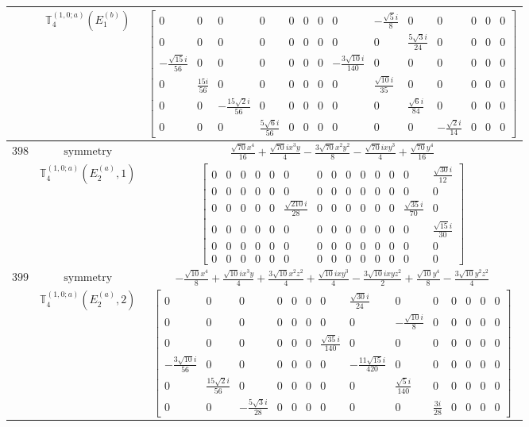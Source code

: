 \documentclass[fleqn,8pt,landscape]{jsarticle}
\begin{document}
\begin{longtable}{ccc}
$  $ & $ \mathbb{T}_{4}^{(1,0;a)}(E_{1}^{(b)}) $ & $ \begin{bmatrix} 0 & 0 & 0 & 0 & 0 & 0 & 0 & 0 & - \frac{\sqrt{5} i}{8} & 0 & 0 & 0 & 0 & 0 \\ 0 & 0 & 0 & 0 & 0 & 0 & 0 & 0 & 0 & \frac{5 \sqrt{3} i}{24} & 0 & 0 & 0 & 0 \\ - \frac{\sqrt{15} i}{56} & 0 & 0 & 0 & 0 & 0 & 0 & - \frac{3 \sqrt{10} i}{140} & 0 & 0 & 0 & 0 & 0 & 0 \\ 0 & \frac{15 i}{56} & 0 & 0 & 0 & 0 & 0 & 0 & \frac{\sqrt{10} i}{35} & 0 & 0 & 0 & 0 & 0 \\ 0 & 0 & - \frac{15 \sqrt{2} i}{56} & 0 & 0 & 0 & 0 & 0 & 0 & \frac{\sqrt{6} i}{84} & 0 & 0 & 0 & 0 \\ 0 & 0 & 0 & \frac{5 \sqrt{6} i}{56} & 0 & 0 & 0 & 0 & 0 & 0 & - \frac{\sqrt{2} i}{14} & 0 & 0 & 0 \end{bmatrix} $ \\ \hline
$ 398 $ & $ \text{symmetry} $ & $ \frac{\sqrt{70} x^{4}}{16} + \frac{\sqrt{70} i x^{3} y}{4} - \frac{3 \sqrt{70} x^{2} y^{2}}{8} - \frac{\sqrt{70} i x y^{3}}{4} + \frac{\sqrt{70} y^{4}}{16} $ \\
$  $ & $ \mathbb{T}_{4}^{(1,0;a)}(E_{2}^{(a)},1) $ & $ \begin{bmatrix} 0 & 0 & 0 & 0 & 0 & 0 & 0 & 0 & 0 & 0 & 0 & 0 & 0 & \frac{\sqrt{30} i}{12} \\ 0 & 0 & 0 & 0 & 0 & 0 & 0 & 0 & 0 & 0 & 0 & 0 & 0 & 0 \\ 0 & 0 & 0 & 0 & 0 & \frac{\sqrt{210} i}{28} & 0 & 0 & 0 & 0 & 0 & 0 & \frac{\sqrt{35} i}{70} & 0 \\ 0 & 0 & 0 & 0 & 0 & 0 & 0 & 0 & 0 & 0 & 0 & 0 & 0 & \frac{\sqrt{15} i}{30} \\ 0 & 0 & 0 & 0 & 0 & 0 & 0 & 0 & 0 & 0 & 0 & 0 & 0 & 0 \\ 0 & 0 & 0 & 0 & 0 & 0 & 0 & 0 & 0 & 0 & 0 & 0 & 0 & 0 \end{bmatrix} $ \\ \hline
$ 399 $ & $ \text{symmetry} $ & $ - \frac{\sqrt{10} x^{4}}{8} + \frac{\sqrt{10} i x^{3} y}{4} + \frac{3 \sqrt{10} x^{2} z^{2}}{4} + \frac{\sqrt{10} i x y^{3}}{4} - \frac{3 \sqrt{10} i x y z^{2}}{2} + \frac{\sqrt{10} y^{4}}{8} - \frac{3 \sqrt{10} y^{2} z^{2}}{4} $ \\
$  $ & $ \mathbb{T}_{4}^{(1,0;a)}(E_{2}^{(a)},2) $ & $ \begin{bmatrix} 0 & 0 & 0 & 0 & 0 & 0 & 0 & \frac{\sqrt{30} i}{24} & 0 & 0 & 0 & 0 & 0 & 0 \\ 0 & 0 & 0 & 0 & 0 & 0 & 0 & 0 & - \frac{\sqrt{10} i}{8} & 0 & 0 & 0 & 0 & 0 \\ 0 & 0 & 0 & 0 & 0 & 0 & \frac{\sqrt{35} i}{140} & 0 & 0 & 0 & 0 & 0 & 0 & 0 \\ - \frac{3 \sqrt{10} i}{56} & 0 & 0 & 0 & 0 & 0 & 0 & - \frac{11 \sqrt{15} i}{420} & 0 & 0 & 0 & 0 & 0 & 0 \\ 0 & \frac{15 \sqrt{2} i}{56} & 0 & 0 & 0 & 0 & 0 & 0 & \frac{\sqrt{5} i}{140} & 0 & 0 & 0 & 0 & 0 \\ 0 & 0 & - \frac{5 \sqrt{3} i}{28} & 0 & 0 & 0 & 0 & 0 & 0 & \frac{3 i}{28} & 0 & 0 & 0 & 0 \end{bmatrix} $ \\ \hline

\end{longtable}
\end{document}
